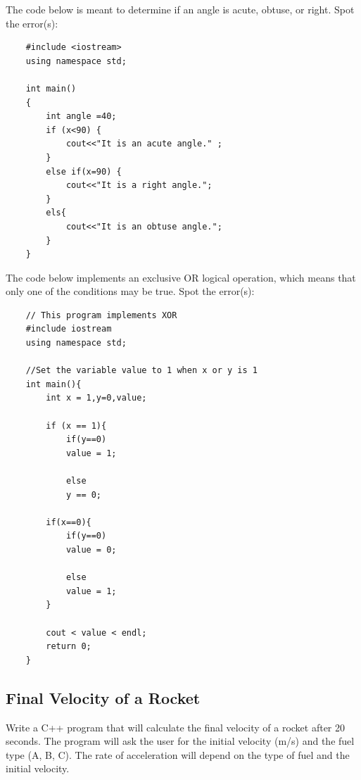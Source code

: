 \begin{multipart}
    The code below is meant to determine if an angle is acute, obtuse, or right. Spot the error(s):
    \begin{verbatim}
    #include <iostream>
    using namespace std;
    
    int main()
    {
        int angle =40;
        if (x<90) { 
            cout<<"It is an acute angle." ;
        }
        else if(x=90) {
            cout<<"It is a right angle.";
        }
        els{
            cout<<"It is an obtuse angle.";
        }
    }
    \end{verbatim}
\end{multipart}

\begin{multipart}
    The code below implements an exclusive OR logical operation, which means that only one of the conditions may be true. Spot the error(s):
    \begin{verbatim}
    // This program implements XOR
    #include iostream
    using namespace std;
    
    //Set the variable value to 1 when x or y is 1
    int main(){
        int x = 1,y=0,value;
        
        if (x == 1){ 
            if(y==0)
            value = 1; 
    
            else
            y == 0; 
         
        if(x==0){ 
            if(y==0)
            value = 0; 
    
            else
            value = 1;
        }
        
        cout < value < endl;
        return 0;
    }
    \end{verbatim}
\end{multipart}

\subsection{Final Velocity of a Rocket}

Write a C++ program that will calculate the final velocity of a rocket after 20 seconds. The program will ask the user for the initial velocity (m/s) and the fuel type (A, B, C). The rate of acceleration will depend on the type of fuel and the initial velocity.

